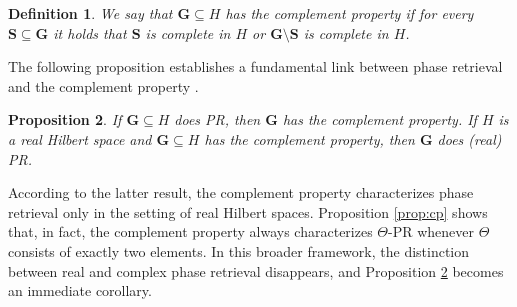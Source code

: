 \documentclass[reqno,a4paper,11pt]{amsart}
\numberwithin{equation}{section}
\newtheorem{definition}{Definition}[section]
\newtheorem{proposition}[definition]{Proposition}
\newcommand\1{\mathds{1}}
\begin{document}
\begin{definition}
    We say that $\mathbf{G} \subseteq H$ has the \emph{complement property} if for every $\mathbf{S} \subseteq \mathbf{G}$ it holds that $\mathbf{S}$ is complete in $H$ or $\mathbf{G} \setminus \mathbf{S}$ is complete in $H$. 
\end{definition}

The following proposition establishes a fundamental link between phase retrieval and the complement property \cite{cahill2016phase}.

\begin{proposition}\label{prop:cp2}
    If $\mathbf{G} \subseteq H$ does PR, then $\mathbf{G}$ has the complement property. If $H$ is a real Hilbert space and $\mathbf{G} \subseteq H$ has the complement property, then $\mathbf{G}$ does (real) PR.
\end{proposition}

According to the latter result, the complement property characterizes phase retrieval only in the setting of real Hilbert spaces. Proposition \ref{prop:cp} shows that, in fact, the complement property always characterizes $\Theta$-PR whenever $\Theta$ consists of exactly two elements. In this broader framework, the distinction between real and complex phase retrieval disappears, and Proposition \ref{prop:cp2} becomes an immediate corollary.
\end{document}
